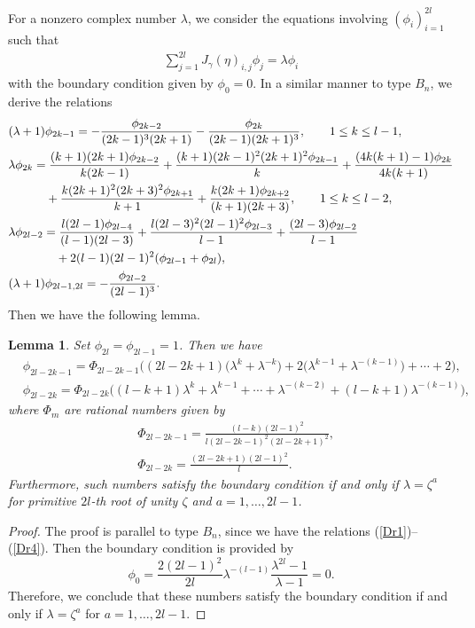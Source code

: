 \documentclass[10pt,a4paper]{amsart}
\numberwithin{equation}{section}
\newtheorem{Lemma}[Theorem]{Lemma}
\begin{document}
For a nonzero complex number $\lambda$, we consider the equations involving $(\phi_i)_{i=1}^{2l}$ such that
	\begin{align}\label{Deq}
	\sum_{j=1}^{2l}J_\gamma(\eta)_{i,j}\phi_j=\lambda\phi_i
	\end{align}
with the boundary condition given by $\phi_0=0$.
In a similar manner to type $B_n$, we derive the relations
	\begin{align}
	\label{Dr1}&(\lambda+1)\phi_{2k-1}=-\frac{\phi_{2k-2}}{(2k-1)^3(2k+1)}-\frac{\phi_{2k}}{(2k-1)(2k+1)^3},\qquad 1\leq k\leq l-1,\\
&\lambda\phi_{2k}=\frac{(k+1)(2k+1)\phi_{2k-2}}{k(2k-1)}+\frac{(k+1)(2k-1)^2(2k+1)^2\phi_{2k-1}}{k}+\frac{(4k(k+1)-1)\phi_{2k}}{4k(k+1)}\nonumber\\
	&\hphantom{\lambda\phi_{2k}=}{}
 +\frac{k(2k+1)^2(2k+3)^2\phi_{2k+1}}{k+1}+\frac{k(2k+1)\phi_{2k+2}}{(k+1)(2k+3)},\qquad 1\leq k\leq l-2 ,\label{Dr2}\\
&\lambda\phi_{2l-2}=\frac{l(2l-1)\phi_{2l-4}}{(l-1)(2l-3)}+\frac{l(2l-3)^2(2l-1)^2\phi_{2l-3}}{l-1}+\frac{(2l-3)\phi_{2l-2}}{l-1}\nonumber\\
	&\hphantom{\lambda\phi_{2l-2}=}{}
 +2(l-1)(2l-1)^2(\phi_{2l-1}+\phi_{2l}),\label{Dr3}\\
	\label{Dr4}&(\lambda+1)\phi_{2l-1,2l}=-\frac{\phi_{2l-2}}{(2l-1)^3}.
	\end{align}
Then we have the following lemma.
		\begin{Lemma}\label{D}
		Set $\phi_{2l}=\phi_{2l-1}=1$.
		Then we have
			\begin{align*}
			&\phi_{2l-2k-1}=\Phi_{2l-2k-1}\bigl((2l-2k+1)\bigl(\lambda^k+\lambda^{-k}\bigr)+2\bigl(\lambda^{k-1}+\lambda^{-(k-1)}\bigr)+\cdots+2\bigr),\\
			&\phi_{2l-2k}=\Phi_{2l-2k}\bigl((l-k+1)\lambda^k+\lambda^{k-1}+\cdots+\lambda^{-(k-2)}+(l-k+1)\lambda^{-(k-1)}\bigr),
			\end{align*}
		 where $\Phi_m$ are rational numbers given by
			\begin{align*}
			&\Phi_{2l-2k-1}=\frac{(l-k)(2l-1)^2}{l(2l-2k-1)^2(2l-2k+1)^2},\\
			&\Phi_{2l-2k}=\frac{(2l-2k+1)(2l-1)^2}{l}.
			\end{align*}
		Furthermore, such numbers satisfy the boundary condition if and only if $\lambda=\zeta^a$ for primitive $2l$-th root of unity $\zeta$ and $a=1,\dots,2l-1$.
		\end{Lemma}
		\begin{proof}
		The proof is parallel to type $B_n$, since we have the relations (\ref{Dr1})--(\ref{Dr4}).
		Then the boundary condition is provided by
			\[\phi_0=\frac{2(2l-1)^2}{2l}\lambda^{-(l-1)}\frac{\lambda^{2l}-1}{\lambda-1}=0.\]
		Therefore, we conclude that these numbers satisfy the boundary condition if and only if $\lambda=\zeta^a$ for $a=1,\dots,2l-1$.
		\end{proof}
\end{document}

